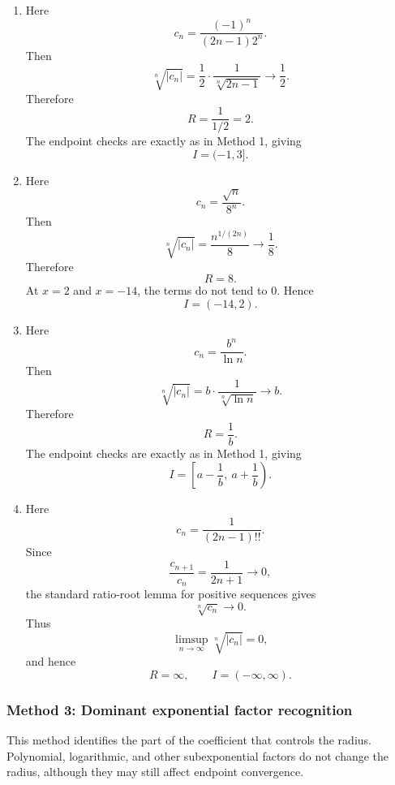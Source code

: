 \documentclass[12pt]{article}
\begin{document}
\begin{enumerate}[label=(\alph*)]
\item Here
\[
c_n=\frac{(-1)^n}{(2n-1)2^n}.
\]
Then
\[
\sqrt[n]{|c_n|}
=
\frac1{2}\cdot\frac1{\sqrt[n]{2n-1}}
\to
\frac12.
\]
Therefore
\[
R=\frac1{1/2}=2.
\]
The endpoint checks are exactly as in Method 1, giving
\[
\boxed{I=(-1,3]}.
\]

\item Here
\[
c_n=\frac{\sqrt n}{8^n}.
\]
Then
\[
\sqrt[n]{|c_n|}
=
\frac{n^{1/(2n)}}8
\to
\frac18.
\]
Therefore
\[
R=8.
\]
At \(x=2\) and \(x=-14\), the terms do not tend to \(0\). Hence
\[
\boxed{I=(-14,2)}.
\]

\item Here
\[
c_n=\frac{b^n}{\ln n}.
\]
Then
\[
\sqrt[n]{|c_n|}
=
b\cdot\frac1{\sqrt[n]{\ln n}}
\to b.
\]
Therefore
\[
R=\frac1b.
\]
The endpoint checks are exactly as in Method 1, giving
\[
\boxed{I=\left[a-\frac1b,\ a+\frac1b\right)}.
\]

\item Here
\[
c_n=\frac1{(2n-1)!!}.
\]
Since
\[
\frac{c_{n+1}}{c_n}=\frac1{2n+1}\to0,
\]
the standard ratio-root lemma for positive sequences gives
\[
\sqrt[n]{c_n}\to0.
\]
Thus
\[
\limsup_{n\to\infty}\sqrt[n]{|c_n|}=0,
\]
and hence
\[
\boxed{R=\infty,\qquad I=(-\infty,\infty)}.
\]
\end{enumerate}

\newpage
\subsubsection*{Method 3: Dominant exponential factor recognition}
This method identifies the part of the coefficient that controls the radius. Polynomial, logarithmic, and other subexponential factors do not change the radius, although they may still affect endpoint convergence.
\end{document}
